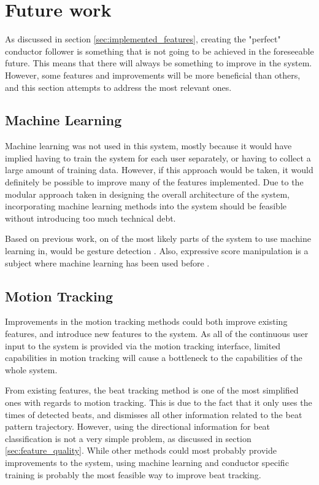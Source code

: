 \section{Future work}
\label{sec:future_work}

As discussed in section \ref{sec:implemented_features},
creating the "perfect" conductor follower
is something that is not going to be achieved
in the foreseeable future.
This means that there will always be
something to improve in the system.
However, some features and improvements
will be more beneficial than others,
and this section attempts to address
the most relevant ones.

\subsection{Machine Learning}

Machine learning was not used in this system,
mostly because it would have implied having
to train the system for each user separately,
or having to collect a large amount of training data.
However, if this approach would be taken,
it would definitely be possible to improve
many of the features implemented.
Due to the modular approach taken
in designing the overall architecture of the system,
incorporating machine learning methods into the system
should be feasible without introducing too much technical debt.

Based on previous work,
on of the most likely parts of the system
to use machine learning in,
would be gesture detection \cite{Fabiani2012}.
Also, expressive score manipulation 
is a subject where machine learning
has been used before \cite{Kirke2012}.

\subsection{Motion Tracking}

Improvements in the motion tracking methods
could both improve existing features,
and introduce new features to the system.
As all of the continuous user input to the system 
is provided via the motion tracking interface,
limited capabilities in motion tracking
will cause a bottleneck to the capabilities of the whole system.

From existing features,
the beat tracking method is one of the most
simplified ones with regards to motion tracking.
This is due to the fact that it only uses
the times of detected beats,
and dismisses all other information
related to the beat pattern trajectory.
However, using the directional information
for beat classification is not a very simple problem,
as discussed in section \ref{sec:feature_quality}.
While other methods could most probably provide
improvements to the system,
using machine learning and conductor specific training
is probably the most feasible way to improve beat tracking.


